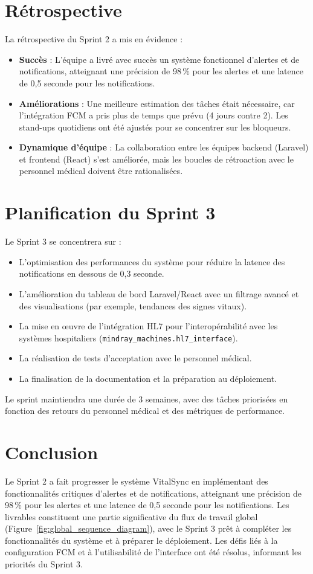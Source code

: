 \section{Rétrospective}
La rétrospective du Sprint 2 a mis en évidence :
\begin{itemize}
    \item \textbf{Succès} : L'équipe a livré avec succès un système fonctionnel d'alertes et de notifications, atteignant une précision de 98\,\% pour les alertes et une latence de 0{,}5 seconde pour les notifications.
    \item \textbf{Améliorations} : Une meilleure estimation des tâches était nécessaire, car l'intégration FCM a pris plus de temps que prévu (4 jours contre 2). Les stand-ups quotidiens ont été ajustés pour se concentrer sur les bloqueurs.
    \item \textbf{Dynamique d'équipe} : La collaboration entre les équipes backend (Laravel) et frontend (React) s'est améliorée, mais les boucles de rétroaction avec le personnel médical doivent être rationalisées.
\end{itemize}

\section{Planification du Sprint 3}
Le Sprint 3 se concentrera sur :
\begin{itemize}
    \item L'optimisation des performances du système pour réduire la latence des notifications en dessous de 0{,}3 seconde.
    \item L'amélioration du tableau de bord Laravel/React avec un filtrage avancé et des visualisations (par exemple, tendances des signes vitaux).
    \item La mise en \oe uvre de l'intégration HL7 pour l'interopérabilité avec les systèmes hospitaliers (\texttt{mindray\_machines.hl7\_interface}).
    \item La réalisation de tests d'acceptation avec le personnel médical.
    \item La finalisation de la documentation et la préparation au déploiement.
\end{itemize}
Le sprint maintiendra une durée de 3 semaines, avec des tâches priorisées en fonction des retours du personnel médical et des métriques de performance.

\section*{Conclusion}
Le Sprint 2 a fait progresser le système VitalSync en implémentant des fonctionnalités critiques d'alertes et de notifications, atteignant une précision de 98\,\% pour les alertes et une latence de 0{,}5 seconde pour les notifications. Les livrables constituent une partie significative du flux de travail global (Figure~\ref{fig:global_sequence_diagram}), avec le Sprint 3 prêt à compléter les fonctionnalités du système et à préparer le déploiement. Les défis liés à la configuration FCM et à l'utilisabilité de l'interface ont été résolus, informant les priorités du Sprint 3.

